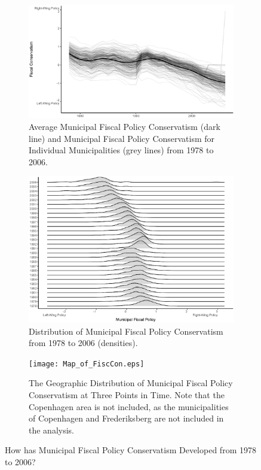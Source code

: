\documentclass[a4paper,12pt]{article}
\begin{document}
\begin{figure}
	\centering 
	\begin{subfigure}[h]{0.38\textwidth} 
		\includegraphics[width=1\textwidth]{fiscal_TimeSeries.eps}
		\caption{Average Municipal Fiscal Policy Conservatism (dark line) and Municipal Fiscal Policy Conservatism for Individual Municipalities (grey lines) from 1978 to 2006.}
		\label{fig:timeline}
	\end{subfigure} \hspace{1cm}
	\begin{subfigure}{0.38\textwidth} 
		\includegraphics[width=1\textwidth]{ConservatismJOY_trend_24092018.eps}
		\caption{Distribution of Municipal Fiscal Policy Conservatism from 1978 to 2006 (densities).}
		\label{fig:lines}
	\end{subfigure}
	\begin{subfigure}{0.9\textwidth} 
		\texttt{[image: Map\_of\_FiscCon.eps]}
		\caption{The Geographic Distribution of Municipal Fiscal Policy Conservatism at Three Points in Time. Note that the Copenhagen area is not included, as the municipalities of Copenhagen and Frederiksberg are not included in the analysis.}
		\label{fig:map}
	\end{subfigure} 
	
	\caption{How has Municipal Fiscal Policy Conservatism Developed from 1978 to 2006?}
	\label{fig:descriptive}
	
\end{figure}
\end{document}
